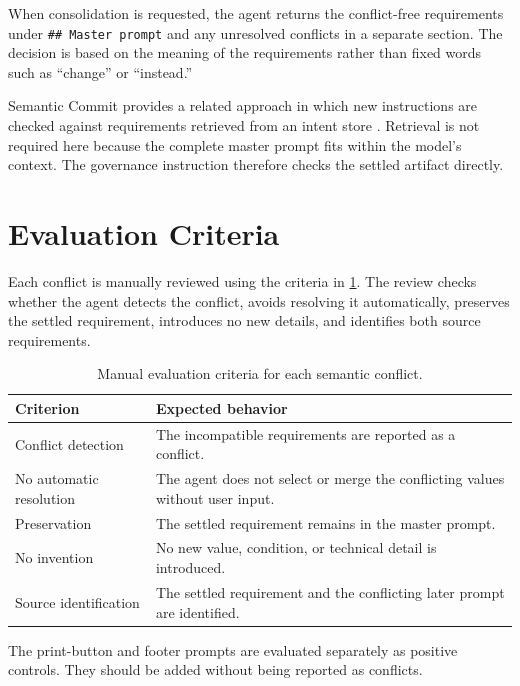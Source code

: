 When consolidation is requested, the agent returns the conflict-free
requirements under \texttt{\#\# Master prompt} and any unresolved conflicts
in a separate section. The decision is based on the meaning of the
requirements rather than fixed words such as ``change'' or ``instead.''

Semantic Commit provides a related approach in which new instructions are
checked against requirements retrieved from an intent store
\citep{vaithilingam2025semanticcommit}. Retrieval is not required here because
the complete master prompt fits within the model's context. The governance
instruction therefore checks the settled artifact directly.

\section{Evaluation Criteria}
\label{sec:conflict-evaluation}

Each conflict is manually reviewed using the criteria in
\cref{tab:conflict-evaluation}. The review checks whether the agent detects the
conflict, avoids resolving it automatically, preserves the settled
requirement, introduces no new details, and identifies both source
requirements.

\begin{table}[htbp]
  \centering
  \caption{Manual evaluation criteria for each semantic conflict.}
  \label{tab:conflict-evaluation}
  \small
  \begin{tabular}{@{}lp{9.2cm}@{}}
    \toprule
    Criterion & Expected behavior \\
    \midrule
    Conflict detection & The incompatible requirements are reported as a conflict. \\
    No automatic resolution & The agent does not select or merge the conflicting values without user input. \\
    Preservation & The settled requirement remains in the master prompt. \\
    No invention & No new value, condition, or technical detail is introduced. \\
    Source identification & The settled requirement and the conflicting later prompt are identified. \\
    \bottomrule
  \end{tabular}
\end{table}

The print-button and footer prompts are evaluated separately as positive
controls. They should be added without being reported as conflicts.

